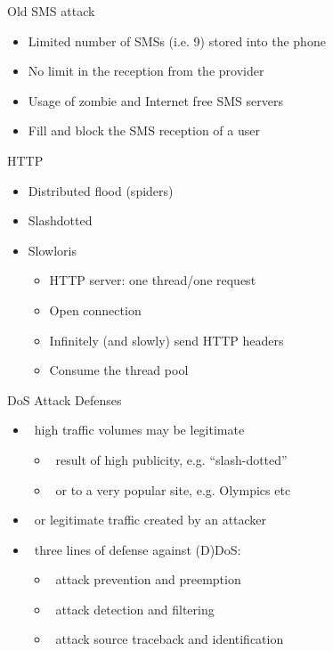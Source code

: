\documentclass{beamer}
\begin{document}
\begin{frame}{Old SMS attack}
  \begin{itemize}
  \item Limited number of SMSs (i.e. 9) stored into the phone
  \item No limit in the reception from the provider
  \item Usage of zombie and Internet free SMS servers
  \item Fill and block the SMS reception of a user
 \end{itemize}
\end{frame}

\begin{frame}{HTTP}
  \begin{itemize}
  \item Distributed flood (spiders)
  \item Slashdotted
  \item Slowloris
  \begin{itemize}
    \item HTTP server: one thread/one request
    \item Open connection
    \item Infinitely (and slowly) send HTTP headers
    \item Consume the thread pool
  \end{itemize}
 \end{itemize}
\end{frame}

\begin{frame}{DoS Attack Defenses }
  \begin{itemize}
  \item  high traffic volumes may be legitimate 
    \begin{itemize}
    \item  result of high publicity, e.g. “slash-dotted” 
    \item  or to a very popular site, e.g. Olympics etc 
    \end{itemize}
  \item  or legitimate traffic created by an attacker 
  \item  three lines of defense against (D)DoS: 
    \begin{itemize}
    \item  attack prevention and preemption 
    \item  attack detection and filtering 
    \item  attack source traceback and identification
    \end{itemize}
  \end{itemize}
\end{frame}
\end{document}

